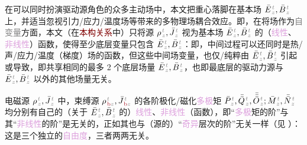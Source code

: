 在可以同时扮演\textcolor{NavyBlue}{驱动源}角色的众多\textcolor{NavyBlue}{主动}场中，本文把重心落脚在\textcolor{NavyBlue}{基本场} $\bar{E}^{\;\!\mathcolor{gray}{t}}_{\;\!\mathcolor{gray}{z}}, \bar{B}^{\;\!\mathcolor{gray}{t}}_{\;\!\mathcolor{gray}{z}}$ 上，并适当忽视引力/应力/温度场等带来的\textcolor{NavyBlue}{多物理场耦合}效应。即，在将场作为\textcolor{gray}{自变量}方面，本文（在\textcolor{Maroon}{本构关系}中）只将源 ${\rho}^{\;\!\mathcolor{gray}{t}}_{\;\!\mathcolor{gray}{z}}, \bar{J}^{\;\!\mathcolor{gray}{t}}_{\;\!\mathcolor{gray}{z}}$ 视为\textcolor{NavyBlue}{基本场} $\bar{E}^{\;\!\mathcolor{gray}{t}}_{\;\!\mathcolor{gray}{z}}, \bar{B}^{\;\!\mathcolor{gray}{t}}_{\;\!\mathcolor{gray}{z}}$ 的（\textcolor{Plum}{线性}、\textcolor{Plum}{非线性}）函数，使得至少底层变量只包含 $\bar{E}^{\;\!\mathcolor{gray}{t}}_{\;\!\mathcolor{gray}{z}}, \bar{B}^{\;\!\mathcolor{gray}{t}}_{\;\!\mathcolor{gray}{z}}$：即，中间过程可以还同时是热/声/应力/温度（梯度）场的函数，但这些中间场变量，也仅/纯粹由 $\bar{E}^{\;\!\mathcolor{gray}{t}}_{\;\!\mathcolor{gray}{z}}, \bar{B}^{\;\!\mathcolor{gray}{t}}_{\;\!\mathcolor{gray}{z}}$ 引起或导致，即共享相同的最多 2 个底层\textcolor{NavyBlue}{场量} $\bar{E}^{\;\!\mathcolor{gray}{t}}_{\;\!\mathcolor{gray}{z}}, \bar{B}^{\;\!\mathcolor{gray}{t}}_{\;\!\mathcolor{gray}{z}}$，也即最底层的驱动力源与 $\bar{E}^{\;\!\mathcolor{gray}{t}}_{\;\!\mathcolor{gray}{z}}, \bar{B}^{\;\!\mathcolor{gray}{t}}_{\;\!\mathcolor{gray}{z}}$ 以外的其他\textcolor{NavyBlue}{场量}无关。

电磁源 ${\rho}^{\;\!\mathcolor{gray}{t}}_{\;\!\mathcolor{gray}{z}}, \bar{J}^{\;\!\mathcolor{gray}{t}}_{\;\!\mathcolor{gray}{z}}$ 中，束缚源 ${\rho}^{\;\!\mathcolor{gray}{t}}_{\;\!\textcolor{Maroon}{\text{b}}\mathcolor{gray}{z}}, \bar{J}^{\;\!\mathcolor{gray}{t}}_{\;\!\textcolor{Maroon}{\text{b}}\mathcolor{gray}{z}}$ 的各阶极化/磁化\textcolor{Plum}{多极}矩 $\bar{P}^{\;\!\mathcolor{gray}{t}}_{\;\!\mathcolor{gray}{z}},\bar{\bar{Q}}^{\;\!\mathcolor{gray}{t}}_{\;\!\mathcolor{gray}{z}},\bar{\bar{\bar{O}}}^{\;\!\mathcolor{gray}{t}}_{\;\!\mathcolor{gray}{z}} ; \bar{M}^{\;\!\mathcolor{gray}{t}}_{\;\!\mathcolor{gray}{z}}, \bar{\bar{N}}^{\;\!\mathcolor{gray}{t}}_{\;\!\mathcolor{gray}{z}}$ 均分别有自己的（关于 $\bar{E}^{\;\!\mathcolor{gray}{t}}_{\;\!\mathcolor{gray}{z}}, \bar{B}^{\;\!\mathcolor{gray}{t}}_{\;\!\mathcolor{gray}{z}}$ 的）\textcolor{Plum}{线性}、\textcolor{Plum}{非线性}（函数），即“\textcolor{Plum}{多极}矩的阶”与其“\textcolor{Plum}{非线性}的阶”是无关的，正如其也与（源的）“\textcolor{Plum}{奇异}层次的阶”无关一样（见 ）：这是三个独立的\textcolor{Plum}{自由度}，三者两两无关。

